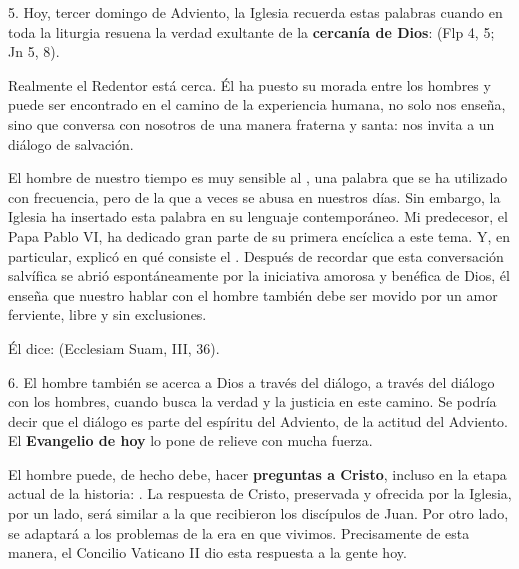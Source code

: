 \begin{body}
					5. Hoy, tercer domingo de Adviento, la Iglesia recuerda estas palabras cuando en toda la liturgia resuena la verdad exultante de la \textbf{cercanía de Dios}:  (Flp 4, 5; Jn 5, 8).
					
					Realmente el Redentor está cerca. Él ha puesto su morada entre los hombres y puede ser encontrado en el camino de la experiencia humana, no solo nos enseña, sino que conversa con nosotros de una manera fraterna y santa: nos invita a un diálogo de salvación.
					
					El hombre de nuestro tiempo es muy sensible al , una palabra que se ha utilizado con frecuencia, pero de la que a veces se abusa en nuestros días. Sin embargo, la Iglesia ha insertado esta palabra en su lenguaje contemporáneo. Mi predecesor, el Papa Pablo VI, ha dedicado gran parte de su primera encíclica a este tema. Y, en particular, explicó en qué consiste el . Después de recordar que esta conversación salvífica se abrió espontáneamente por la iniciativa amorosa y benéfica de Dios, él enseña que nuestro hablar con el hombre también debe ser movido por un amor ferviente, libre y sin exclusiones.
					
					Él dice:  (Ecclesiam Suam, III, 36).
					
					6. El hombre también se acerca a Dios a través del diálogo, a través del diálogo con los hombres, cuando busca la verdad y la justicia en este camino. Se podría decir que el diálogo es parte del espíritu del Adviento, de la actitud del Adviento. El \textbf{Evangelio de hoy} lo pone de relieve con mucha fuerza.
					
					El hombre puede, de hecho debe, hacer \textbf{preguntas a Cristo}, incluso en la etapa actual de la historia: . La respuesta de Cristo, preservada y ofrecida por la Iglesia, por un lado, será similar a la que recibieron los discípulos de Juan. Por otro lado, se adaptará a los problemas de la era en que vivimos. Precisamente de esta manera, el Concilio Vaticano II dio esta respuesta a la gente hoy.
					

\end{body}

